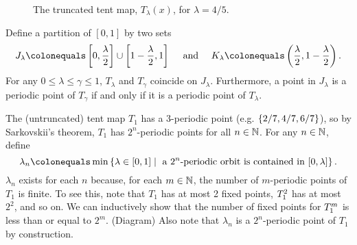 \documentclass[10pt,twoside,draft]{book}
\begin{document}
\begin{example}
\begin{figure}[th]
    \label{fig:tent-map}
    \caption{The truncated tent map, $T_\lambda(x)$, for $\lambda = 4/5$.}
  \end{figure}
  Define a partition of $[0,1]$ by two sets
  \begin{equation*}
    J_\lambda \ceq \brac{0, \frac{\lambda}{2}} \cup \brac{1 - \frac{\lambda}{2}, 1} 
    \quad\mbox{ and }\quad
    K_\lambda \ceq \paren{\frac{\lambda}{2}, 1- \frac{\lambda}{2}}.
  \end{equation*}
  For any $0 \leq \lambda \leq \gamma \leq 1$, $T_\lambda$ and $T_\gamma$ coincide on $J_\lambda$.
  Furthermore, a point in $J_\lambda$ is a periodic point of $T_\gamma$ if and only if it is a periodic point of $T_\lambda$.

  The (untruncated) tent map $T_1$ has a 3-periodic point (e.g. $\left \{ 2/7, 4/7, 6/7 \right \}$), so by Sarkovskii's theorem, $T_1$ has $2^n$-periodic points for all $n \in \mathbb{N}$.
  For any $n \in \mathbb{N}$, define
  \begin{equation*}
    \lambda_n \ceq \min\setst{\lambda \in [0,1]}{\mbox{ a } 2^n\mbox{-periodic orbit is contained in } [0,\lambda]}.
  \end{equation*}
  $\lambda_n$ exists for each $n$ because, for each $m \in \mathbb{N}$, the number of $m$-periodic points of $T_1$ is finite.
  To see this, note that $T_1$ has at most 2 fixed points, $T_1^{2}$ has at most $2^2$, and so on. 
  We can inductively show that the number of fixed points for $T_1^{m}$ is less than or equal to $2^m$. (Diagram)
  Also note that $\lambda_n$ is a $2^n$-periodic point of $T_1$ by construction.


\end{example}
\end{document}
